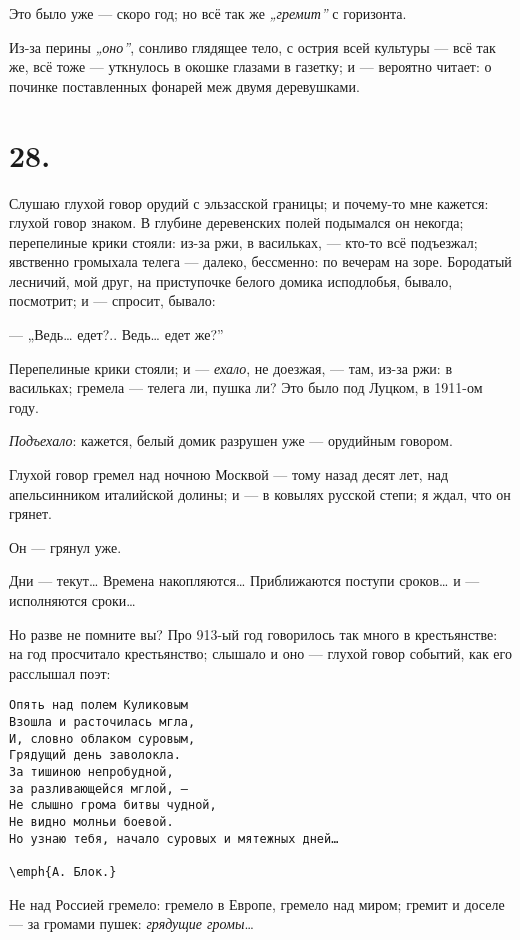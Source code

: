 \documentclass[12pt,a4paper,oneside]{book}
\begin{document}
Это было уже — скоро год; но всё так же \emph{„гремит”} с горизонта.

Из-за перины \emph{„оно”}, сонливо глядящее тело, с острия всей культуры — всё так же, всё тоже — уткнулось в окошке глазами в газетку; и — вероятно читает: о починке поставленных фонарей меж двумя деревушками.

\section*{28.}

Слушаю глухой говор орудий с эльзасской границы; и почему-то мне кажется: глухой говор знаком. В глубине деревенских полей подымался он некогда; перепелиные крики стояли: из-за ржи, в васильках, — кто-то всё подъезжал; явственно громыхала телега — далеко, бессменно: по вечерам на зоре. Бородатый лесничий, мой друг, на приступочке белого домика исподлобья, бывало, посмотрит; и — спросит, бывало:

— „Ведь… едет?.. Ведь… едет же?”

Перепелиные крики стояли; и — \emph{ехало}, не доезжая, — там, из-за ржи: в васильках; гремела — телега ли, пушка ли? Это было под Луцком, в 1911-ом году.

\emph{Подъехало}: кажется, белый домик разрушен уже — орудийным говором.

Глухой говор гремел над ночною Москвой — тому назад десят лет, над апельсинником италийской долины; и — в ковылях русской степи; я ждал, что он грянет.

Он — грянул уже.

Дни — текут… Времена накопляются… Приближаются поступи сроков… и — исполняются сроки…

Но разве не помните вы? Про 913-ый год говорилось так много в крестьянстве: на год просчитало крестьянство; слышало и оно — глухой говор событий, как его расслышал поэт:

\begin{Verbatim}
Опять над полем Куликовым
Взошла и расточилась мгла,
И, словно облаком суровым,
Грядущий день заволокла.
За тишиною непробудной,
за разливающейся мглой, —
Не слышно грома битвы чудной,
Не видно молньи боевой.
Но узнаю тебя, начало суровых и мятежных дней…
                                                                      \emph{А. Блок.}
\end{Verbatim}

Не над Россией гремело: гремело в Европе, гремело над миром; гремит и доселе — за громами пушек: \emph{грядущие громы}…
\end{document}
